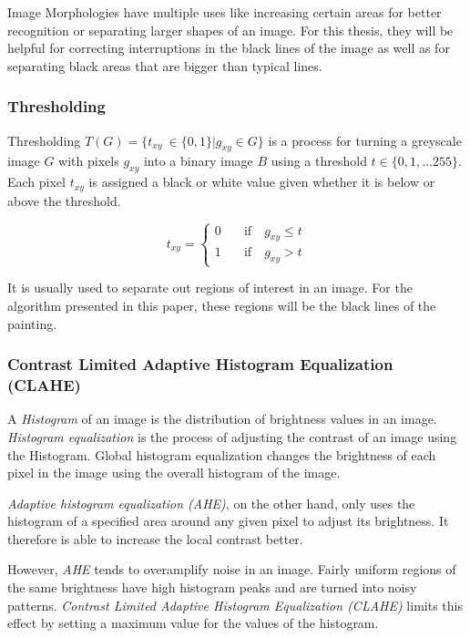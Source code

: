 \documentclass[serif,article,noparskip]{agse-thesis}
\begin{document}
Image Morphologies have multiple uses like increasing certain areas for better
recognition or separating larger shapes of an image. For this thesis, they will
be helpful for correcting interruptions in the black lines of the image as well
as for separating black areas that are bigger than typical lines.

\subsubsection{Thresholding}

Thresholding $T(G) = \{t_{xy}\ \in \{0,1\} | g_{xy} \in G\}$ is a process for turning a greyscale image $G$
with pixels $g_{xy}$ into a binary image $B$ using a threshold $t \in \{
0,1,\dots255\}$. Each pixel $t_{xy}$ is assigned a black or white value given
whether it is below or above the threshold.

\begin{equation}
  t_{xy} =
  \begin{cases}
    0 & \quad  \text{if}  \quad g_{xy} \leq t\\
    1  & \quad \text{if}  \quad g_{xy} > t
  \end{cases}
\end{equation}

It is usually used to separate out regions of interest in an image. For the
algorithm presented in this paper, these regions will be the black lines of the
painting.

\subsubsection{Contrast Limited Adaptive Histogram
Equalization (CLAHE)} \label{clahe}

A \textit{Histogram} of an image is the distribution of brightness values in an
image. \textit{Histogram equalization} is the process of adjusting the contrast
of an image using the Histogram. Global histogram equalization changes the
brightness of each pixel in the image using the overall histogram of the image.
\cite{ShapiroLindaG2001Cv}

\textit{Adaptive histogram equalization (AHE)}, on the other hand, only uses the
histogram of a specified area around any given pixel to adjust its brightness. It
therefore is able to increase the local contrast better.

However, \textit{AHE} tends to overamplify noise in an image. Fairly uniform
regions of the same brightness have high histogram peaks and are turned into
noisy patterns.  \textit{Contrast Limited Adaptive Histogram Equalization
(CLAHE)} limits this effect by setting a maximum value for the values of the
histogram. \cite{Pizer1987}
\end{document}
